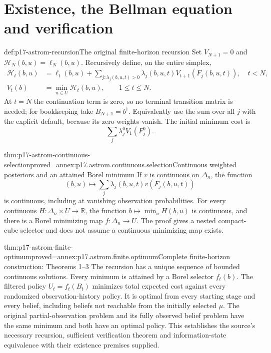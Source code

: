 \section{Existence, the Bellman equation and verification}

\begin{hbdefinition}{def:p17-astrom-recursion}{The original finite-horizon recursion}
Set \(V_{N+1}=0\) and \(\mathcal H_N(b,u)=\ell_N(b,u)\).
Recursively define, on the entire simplex,
\[
 \begin{split}
 \mathcal H_t(b,u)&=\ell_t(b,u)+
       \sum_{j:\lambda_j(b,u,t)>0}
               \lambda_j(b,u,t)V_{t+1}(F_j(b,u,t)),\quad t<N,\\
 V_t(b)&=\min_{u\in U}\mathcal H_t(b,u),\qquad 1\leq t\leq N .
 \end{split}
\]
At \(t=N\) the continuation term is zero, so no terminal
transition matrix is needed; for bookkeeping take
\(B_{N+1}=b^\dagger\).
Equivalently use the sum over all
\(j\) with the explicit default, because its zero weights vanish.
The initial minimum cost is
\[
                       \sum_j\lambda_j^0 V_1(F_j^0).
\]
\end{hbdefinition}

\begin{hblemma}{thm:p17-astrom-continuous-selection}{proved=annex:p17.astrom.continuous.selection}{Continuous weighted posteriors and an attained Borel minimum}
If \(v\) is continuous on \(\Delta_n\), the function
\[
             (b,u)\longmapsto
                 \sum_j\lambda_j(b,u,t)v(F_j(b,u,t))
\]
is continuous, including at vanishing observation probabilities.
For every continuous \(H:\Delta_n\times U\to\mathbb R\),
the function \(b\mapsto\min_uH(b,u)\) is continuous, and
there is a Borel minimizing map \(f:\Delta_n\to U\).
The proof gives a nested compact-cube selector and does not
assume a continuous minimizing map exists.
\end{hblemma}

\begin{hbtheorem}{thm:p17-astrom-finite-optimum}{proved=annex:p17.astrom.finite.optimum}{Complete finite-horizon construction: Theorems 1--3}
The recursion has a unique sequence of bounded continuous solutions.
Every minimum is attained by a Borel selector \(f_t(b)\).
The filtered policy \(U_t=f_t(B_t)\) minimizes total expected
cost against every randomized observation-history policy.
It is optimal from every starting stage and every belief,
including beliefs not reachable from the initially selected \(\mu\).
The original partial-observation problem and its fully observed
belief problem have the same minimum and both have an optimal policy.
This establishes the source's necessary recursion, sufficient
verification theorem and information-state equivalence with
their existence premises supplied.
\end{hbtheorem}

